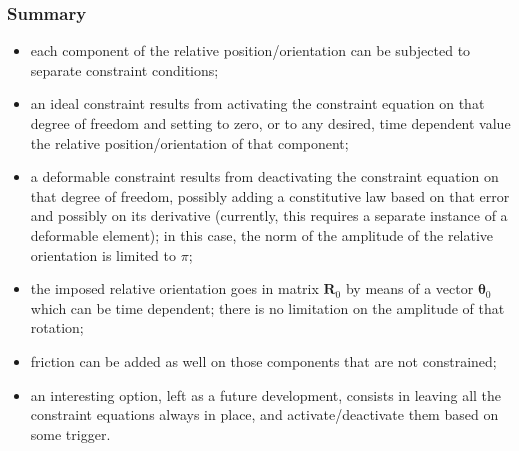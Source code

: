 \documentclass[10pt,dvips,fleqn,subeqn]{report}
\newcommand{\T}[1]{\boldsymbol{#1}}
\begin{document}
\subsubsection{Summary}
\begin{itemize}
\item each component of the relative position/orientation can be subjected
to separate constraint conditions;
\item an ideal constraint results from activating the constraint equation
on that degree of freedom and setting to zero, or to any desired,
time dependent value the relative position/orientation of that component;
\item a deformable constraint results from deactivating the constraint
equation on that degree of freedom, possibly adding a constitutive law
based on that error and possibly on its derivative (currently, this requires
a separate instance of a deformable element);
in this case, the norm of the amplitude of the relative orientation 
is limited to $\pi$;
\item the imposed relative orientation goes in matrix $\T{R}_0$
by means of a vector $\T{\theta}_0$ which can be time dependent;
there is no limitation on the amplitude of that rotation;
\item friction can be added as well on those components
that are not constrained;
\item an interesting option, left as a future development, consists
in leaving all the constraint equations always in place,
and activate/deactivate them based on some trigger.
\end{itemize}
 
\end{document}
